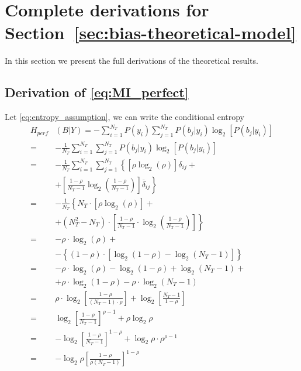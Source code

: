 \section{Complete derivations for Section~\ref{sec:bias-theoretical-model}}

In this section we present the full derivations of the theoretical results.

\subsection{Derivation of \eqref{eq:MI_perfect}}
\label{appendix:MI_perfect}
Let \eqref{eq:entropy_assumption}, we can write the conditional entropy
\begin{align}
    H_{perf}&(B|Y) = -\sum_{i=1}^{N_T} P(y_i) \sum_{j=1}^{N_T} P(b_j | y_i) \log_{2} \left [P(b_j | y_i) \right ]\nonumber\\
    =& -\frac{1}{N_T} \sum_{i=1}^{N_T} \sum_{j=1}^{N_T} P(b_j | y_i) \log_{2} [P(b_j | y_i)]\nonumber\\
    =& -\frac{1}{N_T}  \sum_{i=1}^{N_T} \sum_{j=1}^{N_T} \left\{ [\rho \log_{2}(\rho)] \delta_{ij} +\right .\nonumber\\
    &\left . +\left[\frac{1-\rho}{N_T-1} \log_{2}\left(\frac{1-\rho}{N_T-1}\right)\right]\overline{\delta}_{ij} \right\}\nonumber\\
    =& -\frac{1}{N_T} \left\{ N_T\cdot [\rho \log_{2}(\rho)] +\right .\nonumber\\
    &\left . +(N_T^2 - N_T)\cdot\left[\frac{1-\rho}{N_T-1}\cdot \log_{2}\left(\frac{1-\rho}{N_T - 1}\right)\right]\right\}\nonumber\\
    =& - \rho \cdot \log_{2}(\rho) +\nonumber\\
    & - \left\{(1-\rho)\cdot [\log_{2}(1-\rho) - \log_{2}(N_T-1)]\right\}\nonumber\\
    =& - \rho \cdot \log_{2}(\rho) - \log_{2}(1-\rho) +\log_{2}(N_T-1) +\nonumber\\
    & + \rho \cdot \log_{2}(1-\rho) - \rho \cdot\log_{2}(N_T-1)\nonumber\\
    =& \rho \cdot \log_{2}\left[\frac{1-\rho}{(N_T-1) \cdot\rho}\right] + \log_{2}\left[\frac{N_T-1}{1-\rho}\right]\nonumber\\
    =& \log_{2}\left[\frac{1-\rho}{N_T-1}\right]^{\rho-1} + \rho \log_2 \rho\nonumber\\
    =& -\log_{2}\left[\frac{1-\rho}{N_T-1}\right]^{1-\rho} + \log_2 \rho\cdot \rho^{\rho-1}\nonumber\\
    =& -\log_{2}\rho\left[\frac{1-\rho}{\rho(N_T-1)}\right]^{1-\rho}
\end{align}

